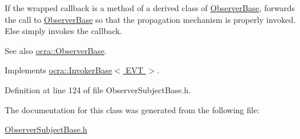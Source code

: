 If the wrapped callback is a method of a derived class of \hyperlink{classocra_1_1ObserverBase}{Observer\+Base}, forwards the call to \hyperlink{classocra_1_1ObserverBase}{Observer\+Base} so that the propagation mechanism is properly invoked. Else simply invokes the callback. \begin{DoxySeeAlso}{See also}
\hyperlink{classocra_1_1ObserverBase}{ocra\+::\+Observer\+Base}. 
\end{DoxySeeAlso}


Implements \hyperlink{classocra_1_1InvokerBase_ae4d7537a1b2c0aa9b5188c5da8423289}{ocra\+::\+Invoker\+Base$<$ E\+V\+T $>$}.



Definition at line 124 of file Observer\+Subject\+Base.\+h.



The documentation for this class was generated from the following file\+:\begin{DoxyCompactItemize}
\item 
\hyperlink{ObserverSubjectBase_8h}{Observer\+Subject\+Base.\+h}\end{DoxyCompactItemize}
